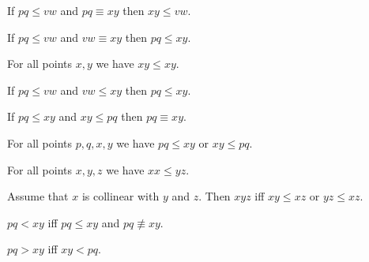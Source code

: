 \documentclass{article}
\newcommand{\Cong}[4]{#1 #2 \equiv #3 #4}
\newcommand{\NotCong}[4]{#1 #2 \not\equiv #3 #4}
\newcommand{\Betw}[3]{#1 #2 #3}
\newcommand{\Leq}[4]{#1 #2 \leq #3 #4}
\newcommand{\Less}[4]{#1 #2 < #3 #4}
\newcommand{\Greater}[4]{#1 #2 > #3 #4}
\begin{document}
  \begin{forthel}
    \begin{lemma}[LessCongLeft] %
      If $\Leq{p}{q}{v}{w}$ and $\Cong{p}{q}{x}{y}$
      then $\Leq{x}{y}{v}{w}$.
    \end{lemma}

    \begin{lemma}[LessCongRight] %
      If $\Leq{p}{q}{v}{w}$ and $\Cong{v}{w}{x}{y}$
      then $\Leq{p}{q}{x}{y}$.
    \end{lemma}

    \begin{lemma}[LessReflexivity] %
      For all points $x, y$ we have $\Leq{x}{y}{x}{y}$.
    \end{lemma}

    \begin{lemma}[LessTransitivity] %
      If $\Leq{p}{q}{v}{w}$ and $\Leq{v}{w}{x}{y}$ then $\Leq{p}{q}{x}{y}$.
    \end{lemma}

    \begin{axiom}[LessClamp] %
      If $\Leq{p}{q}{x}{y}$ and $\Leq{x}{y}{p}{q}$ then $\Cong{p}{q}{x}{y}$.
    \end{axiom}

    \begin{axiom}[LessConnex] %
      For all points $p, q, x, y$ we have $\Leq{p}{q}{x}{y}$ or $\Leq{x}{y}{p}{q}$.
    \end{axiom}

    \begin{lemma} %
      For all points $x, y, z$ we have $\Leq{x}{x}{y}{z}$.
    \end{lemma}

    \begin{axiom} %
      Assume that $x$ is collinear with $y$ and $z$.
      Then $\Betw{x}{y}{z}$ iff $\Leq{x}{y}{x}{z}$ or $\Leq{y}{z}{x}{z}$.
    \end{axiom}
  \end{forthel}


  \begin{forthel}
    \begin{definition}
      $\Less{p}{q}{x}{y}$ iff $\Leq{p}{q}{x}{y}$ and $\NotCong{p}{q}{x}{y}$.
    \end{definition}

    \begin{definition}
      $\Greater{p}{q}{x}{y}$ iff $\Less{x}{y}{p}{q}$.
    \end{definition}
  \end{forthel}
\end{document}
